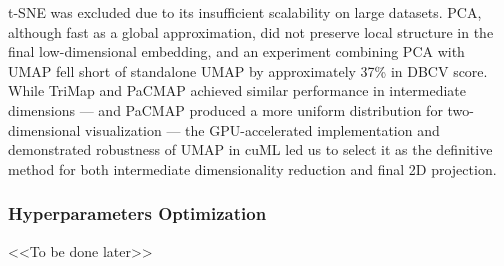 t-SNE was excluded due to its insufficient scalability on large datasets. PCA, although fast as a global approximation,
did not preserve local structure in the final low-dimensional embedding, and an experiment combining PCA with UMAP fell
short of standalone UMAP by approximately 37\% in DBCV score. While TriMap and PaCMAP achieved similar performance
in intermediate dimensions --- and PaCMAP produced a more uniform distribution for two-dimensional visualization ---
the GPU-accelerated implementation and demonstrated robustness of UMAP in cuML led us to select it as the definitive method
for both intermediate dimensionality reduction and final 2D projection.

\subsubsection{Hyperparameters Optimization}
<<To be done later>>